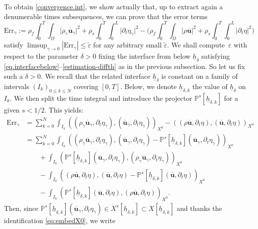 \documentclass[10pt]{amsart}
\newcommand{\Err}{\mathrm{Err}}
\theoremstyle{remark}
\theoremstyle{definition}
\newcommand{\ug}{\boldsymbol{u}}
\let\CM\Omega
\newcommand{\hb}{{\underline{h}}}
\begin{document}
To obtain \eqref{convergence.int}, we show actually that, up to extract again a denumerable times subsequences, we can prove that the error terms
\[
\Err_{\gamma} := \rho_{f}\int_{0}^{T}\!\!\int_{\CM}\vert \rho_{\gamma}\overline{\ug}_{\gamma}\vert^{2}+\rho_{s}\int_{0}^{T}\!\!\int_{0}^{L}\vert\partial_{t}\eta_{\gamma}\vert^{2}
- \biggl( \rho_{f}\int_{0}^{T}\!\!\int_{\CM}\vert \rho\overline{\ug}\vert^{2}+\rho_{s}\int_{0}^{T}\!\!\int_{0}^{L}\vert\partial_{t}\eta\vert^{2} \biggr)
\]
satisfy $\limsup_{\gamma \to 0} |\Err_{\gamma}| \leq \tilde\varepsilon$ for any arbitrary small $\tilde\varepsilon$. We shall compute~$\varepsilon$ with respect to the parameter $\delta >0$ fixing the interface from below $\hb_{\delta}$ satisfying
\eqref{eq.interfacebelow}--\eqref{estimation-diffth} as in the previous subsection. So let us fix such a $\delta >0$.
We recall that the related interface $\hb_{\delta}$
is constant on a family of intervals $(I_k)_{0 \leq k \leq N}$ covering $[0,T]$. Below, we denote $\hb_{\delta,k}$ the value
of $\hb_{\delta}$ on $I_k$. We then split the time integral and introduce the projector $\mathbb P^s[\hb_{\delta,k}]$
for a given $s < 1/2$. This yields:
\begin{align*}
\Err_{\gamma} & = \sum_{k=0}^N \int_{I_{k}} ( (\rho_{\gamma} \overline{\ug}_{\gamma},\partial_t \eta_{\gamma}),( \overline{\ug}_{\gamma},\partial_t \eta_{\gamma}))_{X^0} - ( (\rho \overline{\ug},\partial_t \eta),( \overline{\ug},\partial_t \eta))_{X^0} \\
& = \sum_{k=0}^N \int_{I_{k}} ( (\rho_{\gamma} \overline{\ug}_{\gamma},\partial_t\eta_{\gamma}),( \overline{\ug}_{\gamma},\partial_t \eta_{\gamma})- \mathbb{P}^{s}[\hb_{\delta, k}](\overline{\ug}_{\gamma},\partial_{t}\eta_{\gamma}))_{X^0} \\
& \qquad + \int_{I_{k}} ( \mathbb{P}^{s}[\hb_{\delta, k}](\overline{\ug}_{\gamma},\partial_{t}\eta_{\gamma}),(\rho_{\gamma} \overline{\ug}_{\gamma},\partial_t \eta_{\gamma}))_{X^0} \\
& \qquad - \int_{I_{k}} ( (\rho \overline{\ug},\partial_t \eta),( \overline{\ug},\partial_t \eta)- \mathbb{P}^{s}[\hb_{\delta, k}](\overline{\ug},\partial_{t}\eta))_{X^0} \\
& \qquad - \int_{I_{k}} ( \mathbb{P}^{s}[\hb_{\delta, k}](\overline{\ug},\partial_{t}\eta),(\rho \overline{\ug},\partial_t \eta))_{X^0}.
\end{align*}
Then, since $\mathbb P^s[\hb_{\delta,k}](\overline{\ug}_\gamma,\partial_t \eta_\gamma) \in X^s[\hb_{\delta,k}]\subset X[\hb_{\delta,k}] $ and thanks the identification \eqref{eq:embedX0}, we write
\end{document}
